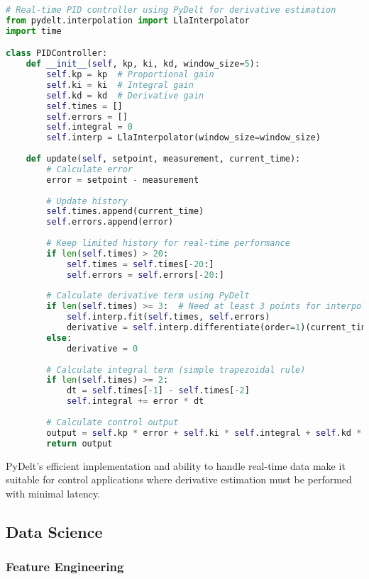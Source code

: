 \documentclass[11pt,a4paper]{article}
\begin{document}
\begin{lstlisting}[language=Python, caption=PID controller with PyDelt example]
# Real-time PID controller using PyDelt for derivative estimation
from pydelt.interpolation import LlaInterpolator
import time

class PIDController:
    def __init__(self, kp, ki, kd, window_size=5):
        self.kp = kp  # Proportional gain
        self.ki = ki  # Integral gain
        self.kd = kd  # Derivative gain
        self.times = []
        self.errors = []
        self.integral = 0
        self.interp = LlaInterpolator(window_size=window_size)
        
    def update(self, setpoint, measurement, current_time):
        # Calculate error
        error = setpoint - measurement
        
        # Update history
        self.times.append(current_time)
        self.errors.append(error)
        
        # Keep limited history for real-time performance
        if len(self.times) > 20:
            self.times = self.times[-20:]
            self.errors = self.errors[-20:]
        
        # Calculate derivative term using PyDelt
        if len(self.times) >= 3:  # Need at least 3 points for interpolation
            self.interp.fit(self.times, self.errors)
            derivative = self.interp.differentiate(order=1)(current_time)
        else:
            derivative = 0
        
        # Calculate integral term (simple trapezoidal rule)
        if len(self.times) >= 2:
            dt = self.times[-1] - self.times[-2]
            self.integral += error * dt
        
        # Calculate control output
        output = self.kp * error + self.ki * self.integral + self.kd * derivative
        return output
\end{lstlisting}

PyDelt's efficient implementation and ability to handle real-time data make it suitable for control applications where derivative estimation must be performed with minimal latency.

\subsection{Data Science}

\subsubsection{Feature Engineering}
\end{document}
